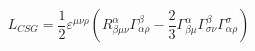\begin{equation}
L_{CSG}=\frac{1}{2}\varepsilon ^{\mu \nu \rho }(R_{\beta \mu \nu }^{\alpha
}\Gamma _{\alpha \rho }^{\beta }-\frac{2}{3}\Gamma _{\beta \mu }^{\alpha
}\Gamma _{\sigma \nu }^{\beta }\Gamma _{\alpha \rho }^{\sigma })
\label{eqn:LCSG}
\end{equation}

